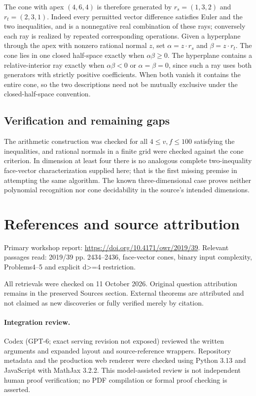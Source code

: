 \documentclass[11pt]{article}
\begin{document}
The cone with apex $(4,6,4)$ is therefore generated by $r_s=(1,3,2)$ and $r_t=(2,3,1)$. Indeed every permitted vector difference satisfies Euler and the two inequalities, and is a nonnegative real combination of these rays; conversely each ray is realized by repeated corresponding operations. Given a hyperplane through the apex with nonzero rational normal $z$, set $\alpha=z\cdot r_s$ and $\beta=z\cdot r_t$. The cone lies in one closed half-space exactly when $\alpha\beta\ge0$. The hyperplane contains a relative-interior ray exactly when $\alpha\beta<0$ or $\alpha=\beta=0$, since such a ray uses both generators with strictly positive coefficients. When both vanish it contains the entire cone, so the two descriptions need not be mutually exclusive under the closed-half-space convention.
\subsection{Verification and remaining gaps}
The arithmetic construction was checked for all $4\le v,f\le100$ satisfying the inequalities, and rational normals in a finite grid were checked against the cone criterion. In dimension at least four there is no analogous complete two-inequality face-vector characterization supplied here; that is the first missing premise in attempting the same algorithm. The known three-dimensional case proves neither polynomial recognition nor cone decidability in the source's intended dimensions.

\section{References and source attribution}
Primary workshop report: \url{https://doi.org/10.4171/owr/2019/39}. Relevant passages read: 2019/39 pp. 2434--2436, face-vector cones, binary input complexity, Problems4--5 and explicit d>=4 restriction.

All retrievals were checked on 11 October 2026. Original question attribution remains in the preserved Sources section. External theorems are attributed and not claimed as new discoveries or fully verified merely by citation.


\paragraph{Integration review.} Codex (GPT-6; exact serving revision not exposed) reviewed the written arguments and expanded layout and source-reference wrappers. Repository metadata and the production web renderer were checked using Python 3.13 and JavaScript with MathJax 3.2.2. This model-assisted review is not independent human proof verification; no PDF compilation or formal proof checking is asserted.
\end{document}
